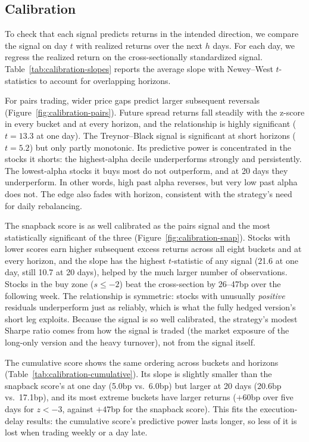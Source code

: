 \documentclass[11pt,letterpaper]{article}
\begin{document}
\subsection{Calibration}

To check that each signal predicts returns in the intended direction, we compare the signal on day $t$ with realized returns over the next $h$ days. For each day, we regress the realized return on the cross-sectionally standardized signal. Table~\ref{tab:calibration-slopes} reports the average slope with Newey--West $t$-statistics to account for overlapping horizons.











For pairs trading, wider price gaps predict larger subsequent reversals (Figure~\ref{fig:calibration-pairs}). Future spread returns fall steadily with the z-score in every bucket and at every horizon, and the relationship is highly significant ($t = 13.3$ at one day). The Treynor--Black signal is significant at short horizons ($t = 5.2$) but only partly monotonic. Its predictive power is concentrated in the stocks it shorts: the highest-alpha decile underperforms strongly and persistently. The lowest-alpha stocks it buys most do not outperform, and at 20 days they underperform. In other words, high past alpha reverses, but very low past alpha does not. The edge also fades with horizon, consistent with the strategy's need for daily rebalancing.

The snapback score is as well calibrated as the pairs signal and the most statistically significant of the three (Figure~\ref{fig:calibration-snap}). Stocks with lower scores earn higher subsequent excess returns across all eight buckets and at every horizon, and the slope has the highest $t$-statistic of any signal (21.6 at one day, still 10.7 at 20 days), helped by the much larger number of observations. Stocks in the buy zone ($s \le -2$) beat the cross-section by 26--47bp over the following week. The relationship is symmetric: stocks with unusually \emph{positive} residuals underperform just as reliably, which is what the fully hedged version's short leg exploits. Because the signal is so well calibrated, the strategy's modest Sharpe ratio comes from how the signal is traded (the market exposure of the long-only version and the heavy turnover), not from the signal itself.

The cumulative score shows the same ordering across buckets and horizons (Table~\ref{tab:calibration-cumulative}). Its slope is slightly smaller than the snapback score's at one day (5.0bp vs.\ 6.0bp) but larger at 20 days (20.6bp vs.\ 17.1bp), and its most extreme buckets have larger returns ($+60$bp over five days for $z < -3$, against $+47$bp for the snapback score). This fits the execution-delay results: the cumulative score's predictive power lasts longer, so less of it is lost when trading weekly or a day late.
\end{document}
